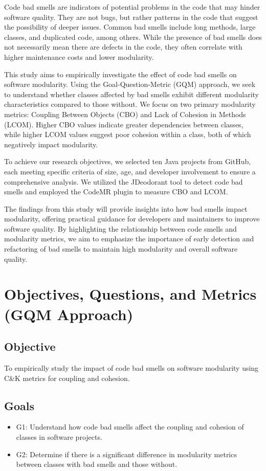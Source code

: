 \documentclass[conference]{IEEEtran}
\begin{document}
        Code bad smells are indicators of potential problems in the code that may hinder software quality. They are not bugs, but rather patterns in the code that suggest the possibility of deeper issues. Common bad smells include long methods, large classes, and duplicated code, among others. While the presence of bad smells does not necessarily mean there are defects in the code, they often correlate with higher maintenance costs and lower modularity.
        
        This study aims to empirically investigate the effect of code bad smells on software modularity. Using the Goal-Question-Metric (GQM) approach, we seek to understand whether classes affected by bad smells exhibit different modularity characteristics compared to those without. We focus on two primary modularity metrics: Coupling Between Objects (CBO) and Lack of Cohesion in Methods (LCOM). Higher CBO values indicate greater dependencies between classes, while higher LCOM values suggest poor cohesion within a class, both of which negatively impact modularity.
        
        To achieve our research objectives, we selected ten Java projects from GitHub, each meeting specific criteria of size, age, and developer involvement to ensure a comprehensive analysis. We utilized the JDeodorant tool to detect code bad smells and employed the CodeMR plugin to measure CBO and LCOM.
        
        The findings from this study will provide insights into how bad smells impact modularity, offering practical guidance for developers and maintainers to improve software quality. By highlighting the relationship between code smells and modularity metrics, we aim to emphasize the importance of early detection and refactoring of bad smells to maintain high modularity and overall software quality.

    \section{Objectives, Questions, and Metrics (GQM Approach)}
    \subsection{Objective}
	To empirically study the impact of code bad smells on software modularity using C\&K metrics for coupling and cohesion.
	
    \subsection{Goals}
        \begin{itemize}
            \item G1: Understand how code bad smells affect the coupling and cohesion of classes in software projects.
            \item G2: Determine if there is a significant difference in modularity metrics between classes with bad smells and those without.
        \end{itemize}
		
\end{document}
